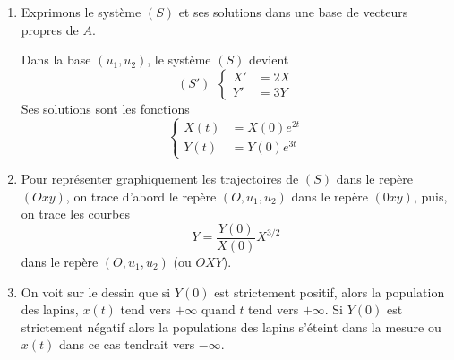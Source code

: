 {{\begin {enumerate}
$$\begin{pmatrix}2x \\  2y\end{pmatrix}\iff x=y,$$
d'o\`u le vecteur propre $u_1=(1,1)$ associ\'e \`a la valeur propre $\lambda_1=2$ . 
$$\begin{pmatrix}4&-2 \\ 1&1 \\ \end{pmatrix}\begin{pmatrix}x \\  y\end{pmatrix}=
\begin{pmatrix}3x \\  3y\end{pmatrix}\iff x=2y,$$
d'o\`u le vecteur propre $u_2=(2,1)$ associ\'e \`a la valeur propre $\lambda_2=3$ .
Dans la base $(u_1, u_2)$, la matrice s'\'ecrit
$$A'=\begin{pmatrix}2&0 \\ 0&3 \\ \end{pmatrix}.$$
On a $A=PA'P^{-1}$ o\`u
$$P=\begin{pmatrix}1&2 \\ 1&1 \\  \end{pmatrix}\ {\hbox{et}}\ P^{-1}=\begin{pmatrix}-1&2 \\ 1&-1 \\ \end{pmatrix}.$$
  \item Exprimons le syst\`eme $(S)$ et ses solutions dans une base de vecteurs propres de $A$.

Dans la base $(u_1, u_2)$, le syst\`eme $(S)$ devient
$$(S')\ \ \left\{\begin{aligned}X'&= 2X \\  Y'&= 3Y\end{aligned}\right.$$
Ses solutions sont les fonctions
$$\left\{\begin{aligned}X(t)&= X(0)e^{2t} \\  Y(t)&=Y(0)e^{3t}\end{aligned}\right.$$

  \item  Pour repr\'esenter graphiquement les trajectoires de $(S)$ dans le rep\`ere $(Oxy)$, on trace d'abord le rep\`ere $(O, u_1,u_2)$ dans le rep\`ere $(0xy)$, puis, on trace les courbes $$Y={\frac{Y(0)}{X(0)}}X^{3/2}$$
dans le rep\`ere $(O, u_1,u_2)$ (ou $OXY$).

  \item On voit sur le dessin que si $Y(0)$ est strictement positif, alors la population des lapins, $x(t)$ tend vers $+\infty$ quand $t$ tend vers $+\infty$. Si $Y(0)$ est strictement n\'egatif alors la populations des lapins s'\'eteint dans la mesure ou $x(t)$ dans ce cas tendrait vers $-\infty$.
\end {enumerate}
}
}
